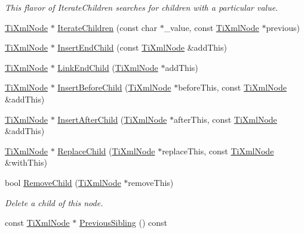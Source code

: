 \begin{DoxyCompactItemize}
\begin{DoxyCompactList}\small\item\em This flavor of Iterate\+Children searches for children with a particular \textquotesingle{}value\textquotesingle{}. \end{DoxyCompactList}\item 
\hyperlink{class_ti_xml_node}{Ti\+Xml\+Node} $\ast$ \hyperlink{class_ti_xml_node_a67ba8275e533e6f76340236c42ea0aea}{Iterate\+Children} (const char $\ast$\+\_\+value, const \hyperlink{class_ti_xml_node}{Ti\+Xml\+Node} $\ast$previous)
\item 
\hyperlink{class_ti_xml_node}{Ti\+Xml\+Node} $\ast$ \hyperlink{class_ti_xml_node_af287a913ce46d8dbf7ef24fec69bbaf0}{Insert\+End\+Child} (const \hyperlink{class_ti_xml_node}{Ti\+Xml\+Node} \&add\+This)
\item 
\hyperlink{class_ti_xml_node}{Ti\+Xml\+Node} $\ast$ \hyperlink{class_ti_xml_node_a1a881212554b759865f6cac79a851d38}{Link\+End\+Child} (\hyperlink{class_ti_xml_node}{Ti\+Xml\+Node} $\ast$add\+This)
\item 
\hyperlink{class_ti_xml_node}{Ti\+Xml\+Node} $\ast$ \hyperlink{class_ti_xml_node_a71e54e393336382bc9875f64aab5cb15}{Insert\+Before\+Child} (\hyperlink{class_ti_xml_node}{Ti\+Xml\+Node} $\ast$before\+This, const \hyperlink{class_ti_xml_node}{Ti\+Xml\+Node} \&add\+This)
\item 
\hyperlink{class_ti_xml_node}{Ti\+Xml\+Node} $\ast$ \hyperlink{class_ti_xml_node_a274db3292218202805c093f66a964cb5}{Insert\+After\+Child} (\hyperlink{class_ti_xml_node}{Ti\+Xml\+Node} $\ast$after\+This, const \hyperlink{class_ti_xml_node}{Ti\+Xml\+Node} \&add\+This)
\item 
\hyperlink{class_ti_xml_node}{Ti\+Xml\+Node} $\ast$ \hyperlink{class_ti_xml_node_a543208c2c801c84a213529541e904b9f}{Replace\+Child} (\hyperlink{class_ti_xml_node}{Ti\+Xml\+Node} $\ast$replace\+This, const \hyperlink{class_ti_xml_node}{Ti\+Xml\+Node} \&with\+This)
\item 
bool \hyperlink{class_ti_xml_node_ae19d8510efc90596552f4feeac9a8fbf}{Remove\+Child} (\hyperlink{class_ti_xml_node}{Ti\+Xml\+Node} $\ast$remove\+This)
\begin{DoxyCompactList}\small\item\em Delete a child of this node. \end{DoxyCompactList}\item 
const \hyperlink{class_ti_xml_node}{Ti\+Xml\+Node} $\ast$ \hyperlink{class_ti_xml_node_a8aacf06b1a577ff0d7cfa502cc76da32}{Previous\+Sibling} () const

\end{DoxyCompactItemize}
